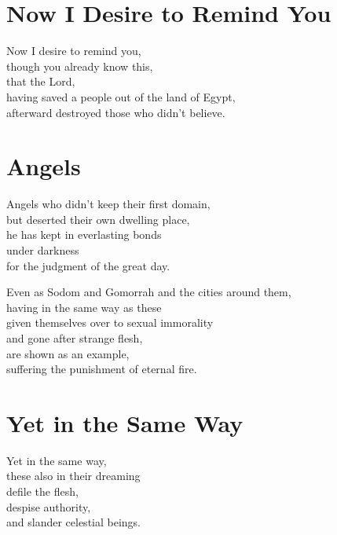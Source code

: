 \newpage\section{Now I Desire to Remind You}

Now I desire to remind you,
\\
\tab{}
though you already know this,
\\
that the Lord,
\\
\tab{}
having saved a people out of the land of Egypt,
\\
\tab{}
afterward destroyed those who didn’t believe.

\newpage\section{Angels}

Angels who didn’t keep their first domain,
\\
but deserted their own dwelling place,
\\
he has kept in everlasting bonds
\\
\tab{}
under darkness
\\
\tab{}
\tab{}
for the judgment of the great day.


Even as Sodom and Gomorrah and the cities around them,
\\
having in the same way as these
\\
\tab{}
given themselves over to sexual immorality
\\
\tab{}
and gone after strange flesh,
\\
are shown as an example,
\\
\tab{}
suffering the punishment of eternal fire.

\newpage\section{Yet in the Same Way}

Yet in the same way,
\\
these also in their dreaming
\\
\tab{}
defile the flesh,
\\
\tab{}
despise authority,
\\
\tab{}
and slander celestial beings.

